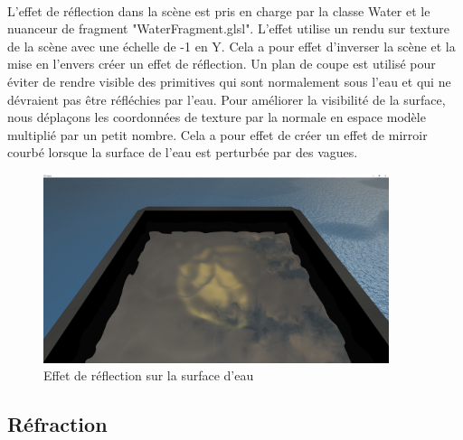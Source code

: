 \documentclass[a4paper, 12pt]{article} %
\begin{document}
	\paragraph{}
	L'effet de réflection dans la scène est pris en charge par la classe Water et le nuanceur de fragment "WaterFragment.glsl". L'effet utilise un rendu sur 
	texture de la scène avec une échelle de -1 en Y. Cela a pour effet d'inverser la scène et la mise en l'envers créer un effet de réflection. Un plan de 
	coupe est utilisé pour éviter de rendre visible des primitives qui sont normalement sous l'eau et qui ne dévraient pas être réfléchies par l'eau. Pour améliorer
	la visibilité de la surface, nous déplaçons les coordonnées de texture par la normale en espace modèle multiplié par un petit nombre. Cela a pour effet de 
	créer un effet de mirroir courbé lorsque la surface de l'eau est perturbée par des vagues.
\begin{figure}
	\centering
	\includegraphics[width=0.9\textwidth]{./PhotoRapport/Reflection.png}
	\caption{Effet de réflection sur la surface d'eau}
	\label{Reflection}
\end{figure}
\subsection{Réfraction}
\end{document}
